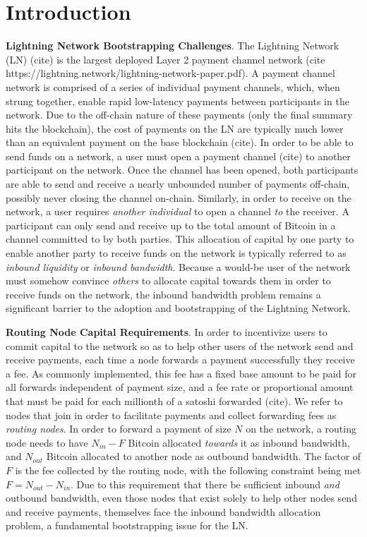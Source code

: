 \documentclass[10pt,a4paper]{article}
\theoremstyle{definition}
\begin{document}
\newpage

\tableofcontents

\vfill

\section{Introduction}

\textbf{Lightning Network Bootstrapping Challenges}. The Lightning Network (LN)
(cite) is the largest deployed Layer 2 payment channel network (cite
https://lightning.network/lightning-network-paper.pdf). A payment channel
network is comprised of a series of individual payment channels, which, when
strung together, enable rapid low-latency payments between participants in the
network. Due to the off-chain nature of these payments (only the final summary
hits the blockchain), the cost of payments on the LN are typically much lower
than an equivalent payment on the base blockchain (cite). In order to be able
to send funds on a network, a user must open a payment channel (cite) to
another participant on the network. Once the channel has been opened, both
participants are able to send and receive a nearly unbounded number of payments
off-chain, possibly never closing the channel on-chain. Similarly, in order to
receive on the network, a user requires \emph{another individual} to open a
channel \emph{to} the receiver. A participant can only send and receive up to
the total amount of Bitcoin in a channel committed to by both parties. This
allocation of capital by one party to enable another party to receive funds on
the network is typically referred to as \emph{inbound liquidity} or
\emph{inbound bandwidth}.  Because a would-be user of the network must somehow
convince \emph{others} to allocate capital towards them in order to receive
funds on the network, the inbound bandwidth problem remains a significant
barrier to the adoption and bootstrapping of the Lightning Network. 

\textbf{Routing Node Capital Requirements}.  In order to incentivize users to
commit capital to the network so as to help other users of the network send and
receive payments, each time a node forwards a payment successfully they receive
a fee. As commonly implemented, this fee has a fixed base amount to be paid for
all forwards independent of payment size, and a fee rate or proportional amount
that must be paid for each millionth of a satoshi forwarded (cite). We refer to
nodes that join in order to facilitate payments and collect forwarding fees as
\emph{routing nodes}. In order to forward a payment of size $N$ on the network,
a routing node needs to have $N_{in} - F$ Bitcoin allocated \emph{towards} it
as inbound bandwidth, and $N_{out}$ Bitcoin allocated to another node as
outbound bandwidth. The factor of $F$ is the fee collected by the routing node,
with the following constraint being met $F = N_{out} - N_{in}$. Due to this
requirement that there be sufficient inbound \emph{and} outbound bandwidth,
even those nodes that exist solely to help other nodes send and receive
payments, themselves face the inbound bandwidth allocation problem, a
fundamental bootstrapping issue for the LN. 
\end{document}
